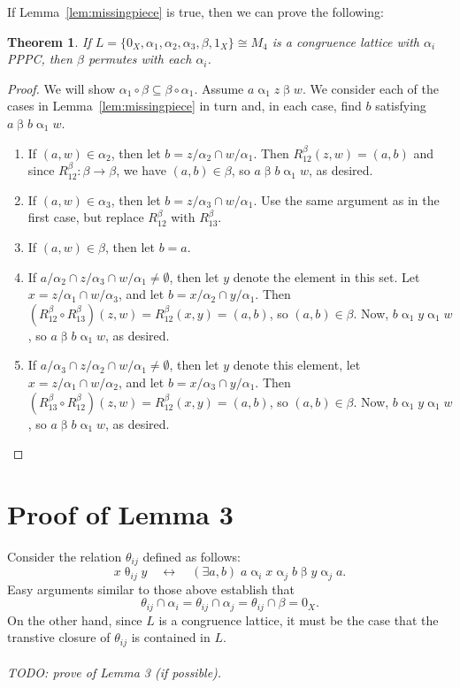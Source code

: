 \documentclass{amsart}
\theoremstyle{plain}
\newtheorem{theorem}{Theorem}
\theoremstyle{definition}
\theoremstyle{definition}
\numberwithin{equation}{section}
\newcommand{\<}{\ensuremath{\langle}}
\renewcommand{\>}{\ensuremath{\rangle}}
\newcommand{\ralpha}{\ensuremath{\mathrel{\alpha}}}
\newcommand{\rbeta}{\ensuremath{\mathrel{\beta}}}
\newcommand{\rtheta}{\ensuremath{\mathrel{\theta}}}
\begin{document}
If Lemma~\ref{lem:missingpiece} is true, then we can prove the following:
\begin{theorem}
If $L = \{0_X, \alpha_1, \alpha_2, \alpha_3, \beta, 1_X\} \cong  M_4$ is a
congruence lattice with $\alpha_i$ \ac{PPPC}, then $\beta$ permutes with each $\alpha_i$.
\end{theorem}
\begin{proof}
We will show $\alpha_1 \circ \beta \subseteq \beta \circ \alpha_1$.
Assume $a \ralpha_1 z \rbeta w$.  We consider each of the cases in
Lemma~\ref{lem:missingpiece} in turn and,
in each case, find $b$ satisfying $a \rbeta b \ralpha_1 w$.
\begin{enumerate}
\item If $(a,w) \in \alpha_2$, then let $b = z/\alpha_2 \cap w/\alpha_1$.  Then
$R^\beta_{12}(z,w) = (a,b)$ and since 
$R^\beta_{12}: \beta \rightarrow \beta$, we have $(a,b) \in \beta$, so 
$a \rbeta b \ralpha_1 w$, as desired.  
\item If $(a,w) \in \alpha_3$, then let $b = z/\alpha_3 \cap w/\alpha_1$. Use the same
argument as in the first case, but replace $R^\beta_{12}$ with $R^\beta_{13}$. 
\item If $(a,w) \in \beta$, then let $b = a$. 
\item If  $a/\alpha_2 \cap z/\alpha_3 \cap w/\alpha_1 \neq \emptyset$, then let
  $y$ denote the element in this set.  Let $x = z/\alpha_1 \cap w/\alpha_3$, and
  let $b = x/\alpha_2\cap y/\alpha_1$.  
  Then $(R^\beta_{12}\circ R^\beta_{13})(z,w) = R^\beta_{12}(x,y) = (a,b)$, so $(a,b) \in \beta$.
  Now, $b\ralpha_1 y \ralpha_1 w$, so
  $a \rbeta b \ralpha_1 w$, as desired.
\item If $a/\alpha_3 \cap z/\alpha_2 \cap w/\alpha_1 \neq \emptyset$, then let 
  $y$ denote this element, let $x = z/\alpha_1 \cap w/\alpha_2$, and
  let $b = x/\alpha_3\cap y/\alpha_1$.  
  Then $(R^\beta_{13}\circ R^\beta_{12})(z,w) = R^\beta_{12}(x,y) = (a,b)$, so $(a,b) \in \beta$.
  Now, $b\ralpha_1 y \ralpha_1 w$, so $a \rbeta b \ralpha_1 w$, as desired.
\end{enumerate}
\end{proof}

\section{Proof of Lemma 3}
Consider the relation $\theta_{ij}$ defined as follows:
\[
x \rtheta_{ij} y \quad \longleftrightarrow \quad (\exists a, b) \;
a \ralpha_i x \ralpha_j b \rbeta y \ralpha_j a.
\]
Easy arguments similar to those above establish that 
\[
\theta_{ij} \cap \alpha_i = \theta_{ij} \cap \alpha_j =
\theta_{ij} \cap \beta = 0_X.\]
On the other hand, since $L$ is a congruence lattice, it must be the case that
the transtive closure of $\theta_{ij}$ is contained in $L$.\\
\\
{\it TODO: prove of Lemma 3 (if possible).}
\end{document}

